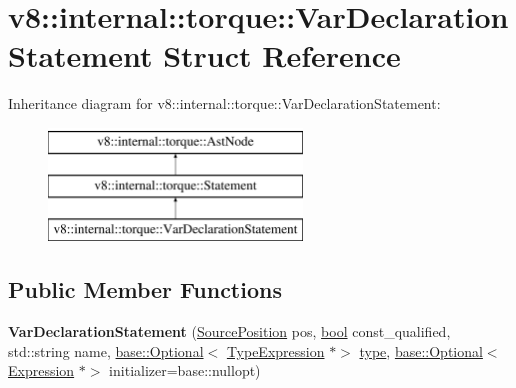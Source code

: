 \hypertarget{structv8_1_1internal_1_1torque_1_1VarDeclarationStatement}{}\section{v8\+:\+:internal\+:\+:torque\+:\+:Var\+Declaration\+Statement Struct Reference}
\label{structv8_1_1internal_1_1torque_1_1VarDeclarationStatement}
Inheritance diagram for v8\+:\+:internal\+:\+:torque\+:\+:Var\+Declaration\+Statement\+:\begin{figure}[H]
\begin{center}
\leavevmode
\includegraphics[height=3.000000cm]{structv8_1_1internal_1_1torque_1_1VarDeclarationStatement}
\end{center}
\end{figure}
\subsection*{Public Member Functions}
\begin{DoxyCompactItemize}
\item 
\mbox{\label{structv8_1_1internal_1_1torque_1_1VarDeclarationStatement_af6c9f937f5c4732c9756f465f3a461fc}} 
{\bfseries Var\+Declaration\+Statement} (\mbox{\hyperlink{structv8_1_1internal_1_1torque_1_1SourcePosition}{Source\+Position}} pos, \mbox{\hyperlink{classbool}{bool}} const\+\_\+qualified, std\+::string name, \mbox{\hyperlink{classv8_1_1base_1_1Optional}{base\+::\+Optional}}$<$ \mbox{\hyperlink{structv8_1_1internal_1_1torque_1_1TypeExpression}{Type\+Expression}} $\ast$$>$ \mbox{\hyperlink{classstd_1_1conditional_1_1type}{type}}, \mbox{\hyperlink{classv8_1_1base_1_1Optional}{base\+::\+Optional}}$<$ \mbox{\hyperlink{structv8_1_1internal_1_1torque_1_1Expression}{Expression}} $\ast$$>$ initializer=base\+::nullopt)
\end{DoxyCompactItemize}
